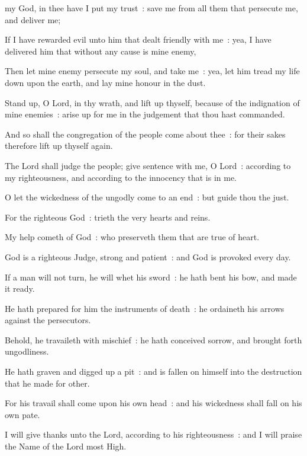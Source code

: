  my God, in thee have I put my trust~: save me from all them that persecute me, and deliver me;\par
{}
If I have rewarded evil unto him that dealt friendly with me~: yea, I have delivered him that without any cause is mine enemy,\par
{}Then let mine enemy persecute my soul, and take me~: yea, let him tread my life down upon the earth, and lay mine honour in the dust.\par
{}Stand up, O Lord, in thy wrath, and lift up thyself, because of the indignation of mine enemies~: arise up for me in the judgement that thou hast commanded.\par
{}And so shall the congregation of the people come about thee~: for their sakes therefore lift up thyself again.\par
{}The Lord shall judge the people; give sentence with me, O Lord~: according to my righteousness, and according to the innocency that is in me.\par
{}O let the wickedness of the ungodly come to an end~: but guide thou the just.\par
{}For the righteous God~: trieth the very hearts and reins.\par
{}My help cometh of God~: who preserveth them that are true of heart.\par
{}God is a righteous Judge, strong and patient~: and God is provoked every day.\par
{}If a man will not turn, he will whet his sword~: he hath bent his bow, and made it ready.\par
{}He hath prepared for him the instruments of death~: he ordaineth his arrows against the persecutors.\par
{}Behold, he travaileth with mischief~: he hath conceived sorrow, and brought forth ungodliness.\par
{}He hath graven and digged up a pit~: and is fallen on himself into the destruction that he made for other.\par
{}For his travail shall come upon his own head~: and his wickedness shall fall on his own pate.\par
{}I will give thanks unto the Lord, according to his righteousness~: and I will praise the Name of the Lord most High.\par

